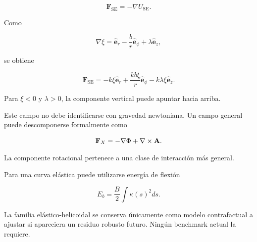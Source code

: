 \begin{equation}
\mathbf F_{\mathrm{SE}}
=
-\nabla U_{\mathrm{SE}}.
\end{equation}

Como

\begin{equation}
\nabla\xi
=
\hat{\mathbf e}_r
-
\frac{b}{r}\hat{\mathbf e}_\phi
+
\lambda\hat{\mathbf e}_z,
\end{equation}

se obtiene

\begin{equation}
\boxed{
\mathbf F_{\mathrm{SE}}
=
-k\xi\hat{\mathbf e}_r
+
\frac{kb\xi}{r}\hat{\mathbf e}_\phi
-
k\lambda\xi\hat{\mathbf e}_z.
}
\end{equation}

Para \(\xi<0\) y \(\lambda>0\), la componente vertical puede apuntar hacia arriba.

Este campo no debe identificarse con gravedad newtoniana. Un campo general puede descomponerse formalmente como

\begin{equation}
\mathbf F_X
=
-\nabla\Phi
+
\nabla\times\mathbf A.
\end{equation}

La componente rotacional pertenece a una clase de interacción más general.

Para una curva elástica puede utilizarse energía de flexión

\begin{equation}
E_b
=
\frac B2
\int
\kappa(s)^2ds.
\end{equation}

La familia elástico-helicoidal se conserva únicamente como modelo contrafactual a ajustar si apareciera un residuo robusto futuro. Ningún benchmark actual la requiere.
